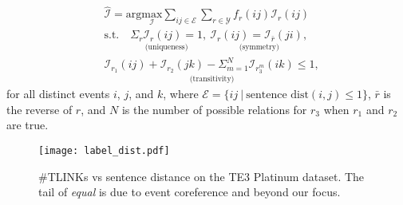 \documentclass[11pt,letterpaper]{article}
\newcommand{\caly}{\mathcal{Y}}
\newcommand{\ignore}[1]{}
\begin{document}
\begin{eqnarray}
\label{eq:basic ilp}
&\hat{\mathcal{I}} = \textrm{arg}\underset{\mathcal{I}}{\textrm{max}}\sum_{ij\in\mathcal{E}}\sum_{r\in\caly} f_r(ij) \mathcal{I}_r(ij)\\
&\textrm{s.t.}\quad\underset{\textrm{(uniqueness)}}{\Sigma_{r}{\mathcal{I}_r(ij)} = 1},~\underset{\textrm{(symmetry)}}{\mathcal{I}_r(ij) = \mathcal{I}_{\bar{r}}(ji),}\nonumber\\
&\underset{\textrm{(transitivity)}}{\mathcal{I}_{r_1}(ij)+\mathcal{I}_{r_2}(jk)-\Sigma_{m=1}^N \mathcal{I}_{r_{3}^m}(ik)\le 1,}\nonumber
\end{eqnarray}
for all distinct events $i$, $j$, and $k$, where $\mathcal{E}=\{ij~|~\textrm{sentence dist$(i,j)$$\le 1$}\}$, $\bar{r}$ is the reverse of $r$, and $N$ is the number of possible relations for $r_{3}$ when $r_1$ and $r_2$ are true.

\ignore{
\begin{equation}
\label{eq:basic ilp}
\begin{aligned}
&\hat{\mathcal{I}} = \textrm{arg}\underset{\mathcal{I}}{\textrm{max}}
&\sum_{ij\in\mathcal{E}}\sum_{r\in\caly} f_r(ij) \mathcal{I}_r(ij)\\
& \text{s.t.}
&\sum_{r}{\mathcal{I}_r(ij)} = 1\\
&\mathcal{I}_r(ij) = \mathcal{I}_{\bar{r}}(ji)\\
&\mathcal{I}_{r_1}(ij)+\mathcal{I}_{r_2}(jk)-\sum_{m=1}^N \mathcal{I}_{r_{3}^m}(ik)\le 1
\end{aligned}
\end{equation}
subject to $\sum_{r}{\mathcal{I}_r(ij)} = 1$ (uniqueness constraints), $\mathcal{I}_r(ij) = \mathcal{I}_{\bar{r}}(ji)$ (symmetry constraints with $r$ and $\bar{r}$ being reverse relations) and  $\mathcal{I}_{r_1}(ij)+\mathcal{I}_{r_2}(jk)-\sum_{m=1}^N \mathcal{I}_{r_{3}^m}(ik)\le 1$ (transitivity constraints), where $N$ is the number of possible relations for $r_{3}$, for all events $i$ and $j$.}

\begin{figure}[h]
	\centering
	\texttt{[image: label\_dist.pdf]}
	\caption{\small \#TLINKs vs sentence distance on the TE3 Platinum dataset. The tail of {\em equal} is due to event coreference and beyond our focus.}
	\label{fig:label_dist}
\end{figure}
\end{document}
